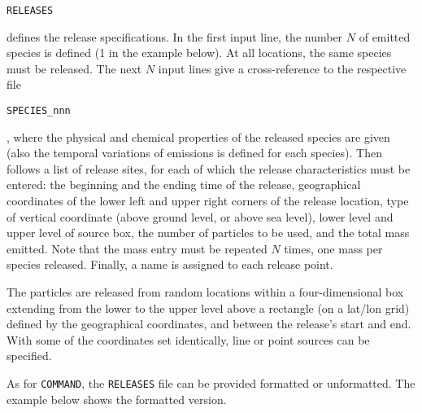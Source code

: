 \documentclass{egu}            %
\begin{document}
\begin{footnotesize}\verb|RELEASES|\end{footnotesize} defines the release
specifications.  In the first input line, the number $N$ of emitted species is
defined (1 in the example below).  At all locations, the same species must be
released.  The next $N$ input lines give a cross-reference to the respective file
\begin{footnotesize}\verb|SPECIES_nnn|\end{footnotesize}, where the physical and
chemical properties of the released species are given (also the temporal
variations of emissions is defined for each species).  Then follows a list of
release sites, for each of which the release characteristics must be entered:
the beginning and the ending time of the release, geographical coordinates of
the lower left and upper right corners of the release location, type of
vertical coordinate (above ground level, or above sea level), lower level and
upper level of source box, the number of particles to be used, and the total
mass emitted.  Note that the mass entry must be repeated $N$ times, one mass
per species released.  Finally, a name is assigned to each release point.\par

The particles are released from random locations within a four-dimensional box
extending from the lower to the upper level above a rectangle (on a lat/lon
grid) defined by the geographical coordinates, and between the release's start
and end.  With some of the coordinates set identically, line or point sources
can be specified.

As for \verb|COMMAND|, the \verb|RELEASES| file can be provided formatted or
unformatted.  The example below shows the formatted version.
\end{document}
